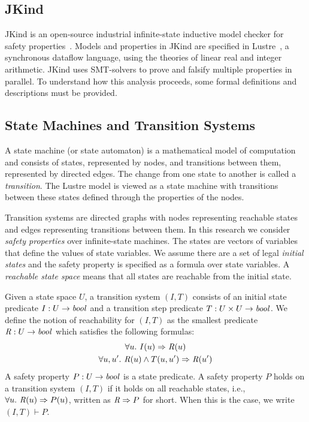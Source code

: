 \subsection{JKind}
JKind is an open-source industrial infinite-state inductive model checker for safety properties~\cite{2017arXiv171201222G}. Models and properties in JKind are specified in Lustre~\cite{Halbwachs91:IEEE}, a synchronous dataflow language, using the theories of linear real and integer arithmetic. JKind uses SMT-solvers to prove and falsify multiple properties in parallel. To understand how this analysis proceeds, some formal definitions and descriptions must be provided. 

\subsection{State Machines and Transition Systems}
A state machine (or state automaton) is a mathematical model of computation and consists of states, represented by nodes, and transitions between them, represented by directed edges. The change from one state to another is called a {\em transition}. The Lustre model is viewed as a state machine with transitions between these states defined through the properties of the nodes. 

Transition systems are directed graphs with nodes representing reachable states and edges representing transitions between them. In this research we consider \emph{safety properties} over infinite-state machines. The states are vectors of variables that define the values of state variables. We assume there are a set of legal \emph{initial states} and the safety property is specified as a formula over state variables. A \emph{reachable state space} means that all states are reachable from the initial state. 

Given a state space $U$, a transition system $(I,T)$ consists of an
initial state predicate $I : U \to \mathit{bool}$ and a transition step
predicate $T : U \times U \to \mathit{bool}$.
We define the notion of
reachability for $(I, T)$ as the smallest predicate $\mathit{R} : U \to
\mathit{bool}$ which satisfies the following formulas:
\begin{gather*}
  \forall u.~ I(u) \Rightarrow \mathit{R}(u) \\
  \forall u, u'.~ \mathit{R}(u) \land T(u, u') \Rightarrow \mathit{R}(u')
\end{gather*}
A safety property $P : U \to \mathit{bool}$ is a state predicate. A safety
property $P$ holds on a transition system $(I, T)$ if it holds on all
reachable states, i.e., $\forall u.~ \mathit{R}(u) \Rightarrow P(u)$,
written as $\mathit{R} \Rightarrow P$ for short. When this is the case, we
write $(I, T)\vdash P$.

